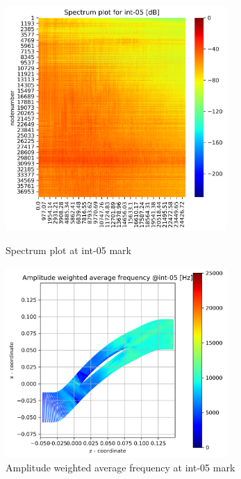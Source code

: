 \begin{figure}[ht]
  \centering
  \includegraphics[width=0.75\textwidth]{Figures/int-05_spectrum.png}
  \caption{Spectrum plot at int-05 mark} \label{int-05-spectrum}
  
  \vspace*{\floatsep}%

  \includegraphics[width=0.75\textwidth]{Figures/int-05-awaf.png}
  \caption{Amplitude weighted average frequency at int-05 mark} \label{int-05-awaf}
\end{figure}
